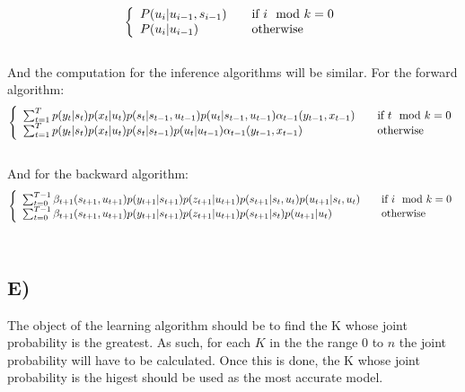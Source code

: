 \documentclass{report}
\begin{document}
\begin{equation}
  \left\{
  \begin{array}{l l}
    P(u_i | u_{i-1}, s_{i-1}) & \quad \text{if } i \mod k = 0 \\
    P(u_i | u_{i-1}) & \quad \text{otherwise}

  \end{array} \right.
\end{equation}\\
And the computation for the inference algorithms will be similar. For the forward
algorithm:
\begin{equation}
  \left\{
  \begin{array}{l l}
  \sum_{t = 1}^T p(y_t | s_t) p(x_t | u_t) p(s_t | s_{t-1}, u_{t-1}) p(u_t | s_{t-1}, u_{t-1}) \alpha_{t-1}(y_{t-1}, x_{t-1}) & \quad \text{if } t \mod k = 0 \\
  \sum_{t = 1}^T p(y_t | s_t) p(x_t | u_t) p(s_t | s_{t-1}) p(u_t | u_{t-1}) \alpha_{t-1}(y_{t-1}, x_{t-1}) & \quad \text{otherwise}

  \end{array} \right.
\end{equation}\\
And for the backward algorithm:
\begin{equation}
  \left\{
  \begin{array}{l l}
  \sum_{t=0}^{T-1} \beta_{t+1}(s_{t+1}, u_{t+1}) p(y_{t+1} | s_{t+1}) p(z_{t+1} | u_{t+1}) p(s_{t+1} | s_t, u_t) p(u_{t+1} | s_t, u_t) & \quad \text{if } i \mod k = 0 \\
  \sum_{t=0}^{T-1} \beta_{t+1}(s_{t+1}, u_{t+1}) p(y_{t+1} | s_{t+1}) p(z_{t+1} | u_{t+1}) p(s_{t+1} | s_t) p(u_{t+1} | u_t) & \quad \text{otherwise}

  \end{array} \right.
\end{equation}\\
\subsection*{E)}
The object of the learning algorithm should be to find the K whose joint probability
is the greatest. As such, for each $K$ in the the range $0$ to $n$ the joint probability
will have to be calculated. Once this is done, the K whose joint probability is the
higest should be used as the most accurate model.
\end{document}
